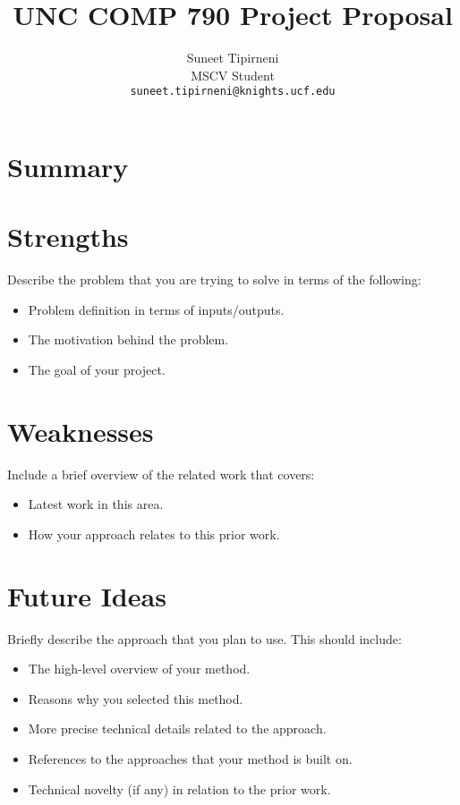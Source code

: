 \documentclass[10pt,twocolumn,letterpaper]{article}
\begin{document}
\title{UNC COMP 790 Project Proposal}

\author{Suneet Tipirneni\\
MSCV Student\\
{\tt\small suneet.tipirneni@knights.ucf.edu}}

\maketitle
\ificcvfinal\thispagestyle{empty}\fi


\section{Summary}

\section{Strengths}

Describe the problem that you are trying to solve in terms of the following:
\begin{itemize}
    \item Problem definition in terms of inputs/outputs.
    \item The motivation behind the problem.
    \item The goal of your project.
\end{itemize}


\section{Weaknesses}

Include a brief overview of the related work that covers:
\begin{itemize}
    \item Latest work in this area.
    \item How your approach relates to this prior work.
\end{itemize}

\section{Future Ideas}

Briefly describe the approach that you plan to use. This should include:

\begin{itemize}
    \item The high-level overview of your method.
    \item Reasons why you selected this method.
    \item More precise technical details related to the approach.
    \item References to the approaches that your method is built on.
    \item Technical novelty (if any) in relation to the prior work.
\end{itemize}
\end{document}
